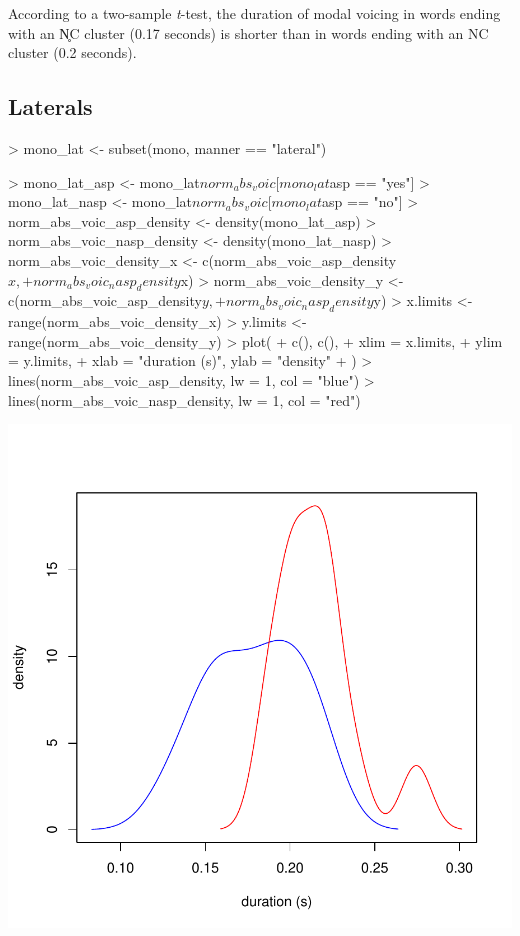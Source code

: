 \documentclass[a4paper,11pt]{article}
\begin{document}
According to a two-sample \textit{t}-test, the duration of modal voicing in words ending with an N̥C cluster (0.17 seconds) is shorter than in words ending with an NC cluster (0.2 seconds).

\subsection{Laterals}

\begin{Schunk}
\begin{Sinput}
> mono_lat <- subset(mono, manner == "lateral")
\end{Sinput}
\end{Schunk}

\begin{Schunk}
\begin{Sinput}
> mono_lat_asp <- mono_lat$norm_abs_voic[mono_lat$asp == "yes"]
> mono_lat_nasp <- mono_lat$norm_abs_voic[mono_lat$asp == "no"]
> norm_abs_voic_asp_density <- density(mono_lat_asp)
> norm_abs_voic_nasp_density <- density(mono_lat_nasp)
> norm_abs_voic_density_x <- c(norm_abs_voic_asp_density$x, 
+                                   norm_abs_voic_nasp_density$x)
> norm_abs_voic_density_y <- c(norm_abs_voic_asp_density$y, 
+                                   norm_abs_voic_nasp_density$y)
> x.limits <- range(norm_abs_voic_density_x)
> y.limits <- range(norm_abs_voic_density_y)
> plot(
+ c(), c(),
+ xlim = x.limits,
+ ylim = y.limits,
+ xlab = "duration (s)", ylab = "density"
+ )
> lines(norm_abs_voic_asp_density, lw = 1, col = "blue")
> lines(norm_abs_voic_nasp_density, lw = 1, col = "red")
\end{Sinput}
\end{Schunk}
\includegraphics{analysis-015}
\end{document}
